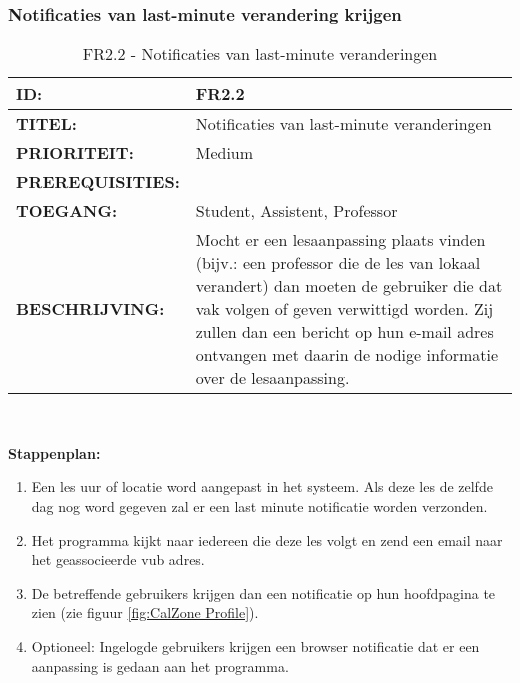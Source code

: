 \subsubsection{Notificaties van last-minute verandering krijgen}        
\noindent\begin{table}[H]
            \begin{tabular}{l | p{10cm}}
                \textbf{ID:} & FR2.2 \\ \hline
                \textbf{TITEL:} & Notificaties van last-minute veranderingen \\ \hline
                \textbf{PRIORITEIT:} &  Medium \\ \hline
                \textbf{PREREQUISITIES:} & \\ \hline
                \textbf{TOEGANG:} & Student, Assistent, Professor \\ \hline
                \textbf{BESCHRIJVING:} & Mocht er een lesaanpassing plaats vinden (bijv.: een professor die de les van lokaal verandert) dan moeten de gebruiker die dat vak volgen of geven verwittigd worden. Zij zullen dan een bericht op hun e-mail adres ontvangen met daarin de nodige informatie over de lesaanpassing.\\
            \end{tabular}\\
            \caption{FR2.2 - Notificaties van last-minute veranderingen}
			\label{tab:FR2.2 - Notificaties van last-minute veranderingen}
        \end{table}      
        
\textbf{Stappenplan:}
	\begin{enumerate}
	\item Een les uur of locatie word aangepast in het systeem. Als deze les de zelfde dag nog word gegeven zal er een last minute notificatie worden verzonden.
	\item Het programma kijkt naar iedereen die deze les volgt en zend een email naar het geassocieerde vub adres.
	\item De betreffende gebruikers krijgen dan een notificatie op hun hoofdpagina te zien (zie figuur \ref{fig:CalZone Profile}).
	\item Optioneel: Ingelogde gebruikers krijgen een browser notificatie dat er een aanpassing is gedaan aan het programma.  
	\end{enumerate}

